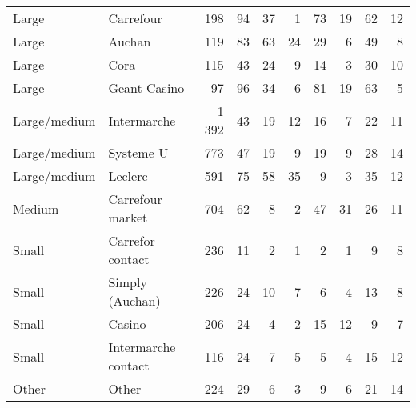 \documentclass[english]{article}
\begin{document}
\begin{table}[hbtp]
\begin{threeparttable}
\begin{tabular}{llr|r|rr|rr|rr}
    Large & Carrefour & 198   & 94    & 37    & 1     & 73    & 19    & 62    & 12 \\
    Large & Auchan & 119   & 83    & 63    & 24    & 29    & 6     & 49    & 8 \\
    Large & Cora  & 115   & 43    & 24    & 9     & 14    & 3     & 30    & 10 \\
    Large & Geant Casino & 97    & 96    & 34    & 6     & 81    & 19    & 63    & 5 \\
    Large/medium & Intermarche & 1 392 & 43    & 19    & 12    & 16    & 7     & 22    & 11 \\
    Large/medium & Systeme U & 773   & 47    & 19    & 9     & 19    & 9     & 28    & 14 \\
    Large/medium & Leclerc & 591   & 75    & 58    & 35    & 9     & 3     & 35    & 12 \\
    Medium & Carrefour market & 704   & 62    & 8     & 2     & 47    & 31    & 26    & 11 \\
    Small & Carrefor contact & 236   & 11    & 2     & 1     & 2     & 1     & 9     & 8 \\
    Small & Simply (Auchan) & 226   & 24    & 10    & 7     & 6     & 4     & 13    & 8 \\
    Small & Casino & 206   & 24    & 4     & 2     & 15    & 12    & 9     & 7 \\
    Small & Intermarche contact & 116   & 24    & 7     & 5     & 5     & 4     & 15    & 12 \\
    Other & Other & 224   & 29    & 6     & 3     & 9     & 6     & 21    & 14 \\
    \bottomrule
    \bottomrule
\end{tabular}
\end{threeparttable}
\end{table}
\end{document}
